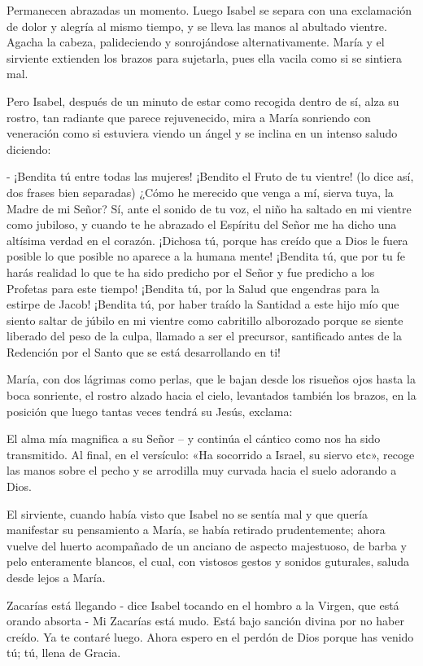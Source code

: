 \documentclass[12pt, twoside, openright]{book} %
\begin{document}
Permanecen abrazadas un momento. Luego Isabel se separa con una exclamación de dolor y alegría al mismo tiempo, y se lleva las manos al abultado vientre. Agacha la cabeza, palideciendo y sonrojándose alternativamente. María y el sirviente extienden los brazos para sujetarla, pues ella vacila como si se sintiera mal. 

Pero Isabel, después de un minuto de estar como recogida dentro de sí, alza su rostro, tan radiante que parece rejuvenecido, mira a María sonriendo con veneración como si estuviera viendo un ángel y se inclina en un intenso saludo diciendo: 

- ¡Bendita tú entre todas las mujeres! ¡Bendito el Fruto de tu vientre! (lo dice así, dos frases bien separadas) ¿Cómo he merecido que venga a mí, sierva tuya, la Madre de mi Señor? Sí, ante el sonido de tu voz, el niño ha saltado en mi vientre como jubiloso, y cuando te he abrazado el Espíritu del Señor me ha dicho una altísima verdad en el corazón. ¡Dichosa tú, porque has creído que a Dios le fuera posible lo que posible no aparece a la humana mente! ¡Bendita tú, que por tu fe harás realidad lo que te ha sido predicho por el Señor y fue predicho a los Profetas para este tiempo! ¡Bendita tú, por la Salud que engendras para la estirpe de Jacob! ¡Bendita tú, por haber traído la Santidad a este hijo mío que siento saltar de júbilo en mi vientre como cabritillo alborozado porque se siente liberado del peso de la culpa, llamado a ser el precursor, santificado antes de la Redención por el Santo que se está desarrollando en ti! 

María, con dos lágrimas como perlas, que le bajan desde los risueños ojos hasta la boca sonriente, el rostro alzado hacia el cielo, levantados también los brazos, en la posición que luego tantas veces tendrá su Jesús, exclama: 

El alma mía magnifica a su Señor – y continúa el cántico como nos ha sido transmitido. Al final, en el versículo: «Ha socorrido a Israel, su siervo etc», recoge las manos sobre el pecho y se arrodilla muy curvada hacia el suelo adorando a Dios. 

El sirviente, cuando había visto que Isabel no se sentía mal y que quería manifestar su pensamiento a María, se había retirado prudentemente; ahora vuelve del huerto acompañado de un anciano de aspecto majestuoso, de barba y pelo enteramente blancos, el cual, con vistosos gestos y sonidos guturales, saluda desde lejos a María. 

Zacarías está llegando - dice Isabel tocando en el hombro a la Virgen, que está orando absorta - Mi Zacarías está mudo. Está bajo sanción divina por no haber creído. Ya te contaré luego. Ahora espero en el perdón de Dios porque has venido tú; tú, llena de Gracia. 
\end{document}
